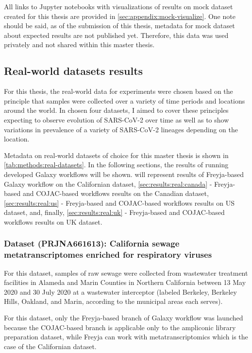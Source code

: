         All links to Jupyter notebooks with visualizations of results on mock dataset created for this thesis are provided in \cref{sec:appendix:mock-visualize}. One note should be said, as of the submission of this thesis, metadata for mock dataset about expected results are not published yet. Therefore, this data was used privately and not shared within this master thesis. 
    \subsection{Real-world datasets results} \label{sec:results:real}
    For this thesis, the real-world data for experiments were chosen based on the principle that samples were collected over a variety of time periods and locations around the world. In chosen four datasets, I aimed to cover these principles expecting to observe evolution of SARS-CoV-2 over time as well as to show variations in prevalence of a variety of SARS-CoV-2 lineages depending on the location.

    Metadata on real-world datasets of choice for this master thesis is shown in \cref{tab:methods:real-datasets}. In the following sections, the results of running developed Galaxy workflows will be shown.  will represent results of Freyja-based Galaxy workflow on the Californian dataset, \cref{sec:results:real:canada} - Freyja-based and COJAC-based workflows results on the Canadian dataset, \cref{sec:results:real:us} - Freyja-based and COJAC-based workflows results on US dataset, and, finally, \cref{sec:results:real:uk} - Freyja-based and COJAC-based workflows results on UK dataset. 

    \subsubsection{Dataset (PRJNA661613): California sewage metatranscriptomes enriched for respiratory viruses} \label{sec:results:real:california}
    For this dataset, samples of raw sewage were collected from wastewater treatment facilities in Alameda and Marin Counties in Northern California between 13 May 2020 and 30 July 2020 at a wastewater interceptor (labeled Berkeley, Berkeley Hills, Oakland, and Marin, according to the municipal areas each serves).

    For this dataset, only the Freyja-based branch of Galaxy workflow was launched because the COJAC-based branch is applicable only to the ampliconic library preparation dataset, while Freyja can work with metatranscriptomics which is the case of the Californian dataset.
    
